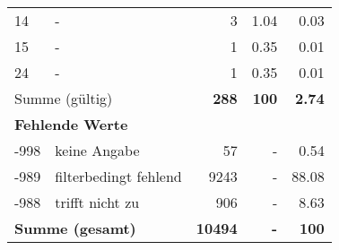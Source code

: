\begin{longtable}{lXrrr}
     14 &
     \multicolumn{1}{X}{ -  } &


       \num{3} &
       \num[round-mode=places,round-precision=2]{1,04} &
         \num[round-mode=places,round-precision=2]{0,03} \\

     15 &
     \multicolumn{1}{X}{ -  } &


       \num{1} &
       \num[round-mode=places,round-precision=2]{0,35} &
         \num[round-mode=places,round-precision=2]{0,01} \\

     24 &
     \multicolumn{1}{X}{ -  } &


       \num{1} &
       \num[round-mode=places,round-precision=2]{0,35} &
         \num[round-mode=places,round-precision=2]{0,01} \\
     \midrule
     \multicolumn{2}{l}{Summe (gültig)} &
       \textbf{\num{288}} &
     \textbf{100} &
       \textbf{\num[round-mode=places,round-precision=2]{2,74}} \\
     \multicolumn{5}{l}{\textbf{Fehlende Werte}}\\
       -998 &
       keine Angabe &
         \num{57} &
        - &
         \num[round-mode=places,round-precision=2]{0,54} \\
       -989 &
       filterbedingt fehlend &
         \num{9243} &
        - &
         \num[round-mode=places,round-precision=2]{88,08} \\
       -988 &
       trifft nicht zu &
         \num{906} &
        - &
         \num[round-mode=places,round-precision=2]{8,63} \\
     \midrule
     \multicolumn{2}{l}{\textbf{Summe (gesamt)}} &
          \textbf{\num{10494}} &
        \textbf{-} &
        \textbf{100} \\
     \bottomrule
     \end{longtable}
     
